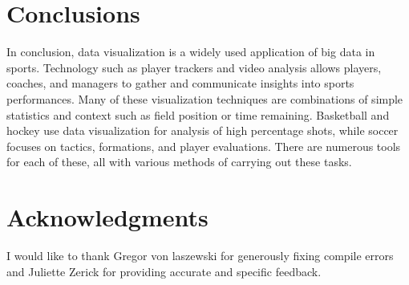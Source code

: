 \documentclass[sigconf]{acmart}
\begin{document}
\section{Conclusions}

In conclusion, data visualization is a widely used application of big data in sports. Technology such as player trackers and video analysis allows players, coaches, and managers to gather and communicate insights into sports performances. Many of these visualization techniques are combinations of simple statistics and context such as field position or time remaining. Basketball and hockey use data visualization for analysis of high percentage shots, while soccer focuses on tactics, formations, and player evaluations. There are numerous tools for each of these, all with various methods of carrying out these tasks.

\section{Acknowledgments}

I would like to thank Gregor von laszewski for generously fixing compile errors and Juliette Zerick for providing accurate and specific feedback.


 
\end{document}
